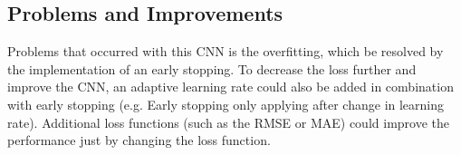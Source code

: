 \subsection{Problems and Improvements}
Problems that occurred with this CNN is the overfitting, which be resolved by the implementation of an early stopping.
To decrease the loss further and improve the CNN, an adaptive learning rate could also be added in combination with early stopping (e.g. Early stopping only applying after change in learning rate).
Additional loss functions (such as the RMSE or MAE) could improve the performance just by changing the loss function.

